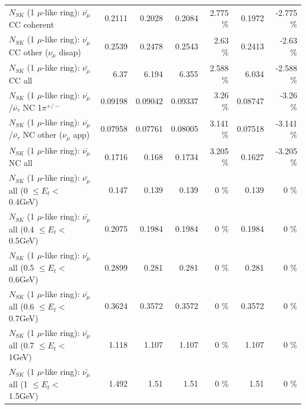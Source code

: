 \begin{table}
\begin{tabular}{| l | r | r | r  r | r  r |}
                       $N_{SK}$ (1 $\mu$-like ring): $\bar{\nu_\mu}$ CC coherent &          0.2111 &          0.2028 &          0.2084 &    2.775 \%  &          0.1972 &   -2.775 \%  \\ 
        $N_{SK}$ (1 $\mu$-like ring): $\bar{\nu_\mu}$ CC other ($\nu_\mu$ disap) &          0.2539 &          0.2478 &          0.2543 &     2.63 \%  &          0.2413 &    -2.63 \%  \\ 
                          $N_{SK}$ (1 $\mu$-like ring): $\bar{\nu_{\mu}}$ CC all &            6.37 &           6.194 &           6.355 &    2.588 \%  &           6.034 &   -2.588 \%  \\ 
\hline
  $N_{SK}$ (1 $\mu$-like ring): $\bar{\nu_\mu}$/$\bar{\nu_\tau}$ NC 1$\pi^{+/-}$ &         0.09198 &         0.09042 &         0.09337 &     3.26 \%  &         0.08747 &    -3.26 \%  \\ 
$N_{SK}$ (1 $\mu$-like ring): $\bar{\nu_\mu}$/$\bar{\nu_\tau}$ NC other ($\nu_\mu$ app) &         0.07958 &         0.07761 &         0.08005 &    3.141 \%  &         0.07518 &   -3.141 \%  \\ 
                          $N_{SK}$ (1 $\mu$-like ring): $\bar{\nu_{\mu}}$ NC all &          0.1716 &           0.168 &          0.1734 &    3.205 \%  &          0.1627 &   -3.205 \%  \\ 
\hline
   $N_{SK}$ (1 $\mu$-like ring): $\bar{\nu_{\mu}}$ all (0 $\leq E_{t} <$ 0.4GeV) &           0.147 &           0.139 &           0.139 &        0 \%  &           0.139 &        0 \%  \\ 
 $N_{SK}$ (1 $\mu$-like ring): $\bar{\nu_{\mu}}$ all (0.4 $\leq E_{t} <$ 0.5GeV) &          0.2075 &          0.1984 &          0.1984 &        0 \%  &          0.1984 &        0 \%  \\ 
 $N_{SK}$ (1 $\mu$-like ring): $\bar{\nu_{\mu}}$ all (0.5 $\leq E_{t} <$ 0.6GeV) &          0.2899 &           0.281 &           0.281 &        0 \%  &           0.281 &        0 \%  \\ 
 $N_{SK}$ (1 $\mu$-like ring): $\bar{\nu_{\mu}}$ all (0.6 $\leq E_{t} <$ 0.7GeV) &          0.3624 &          0.3572 &          0.3572 &        0 \%  &          0.3572 &        0 \%  \\ 
   $N_{SK}$ (1 $\mu$-like ring): $\bar{\nu_{\mu}}$ all (0.7 $\leq E_{t} <$ 1GeV) &           1.118 &           1.107 &           1.107 &        0 \%  &           1.107 &        0 \%  \\ 
   $N_{SK}$ (1 $\mu$-like ring): $\bar{\nu_{\mu}}$ all (1 $\leq E_{t} <$ 1.5GeV) &           1.492 &            1.51 &            1.51 &        0 \%  &            1.51 &        0 \%  \\ 

\end{tabular}
\end{table}
